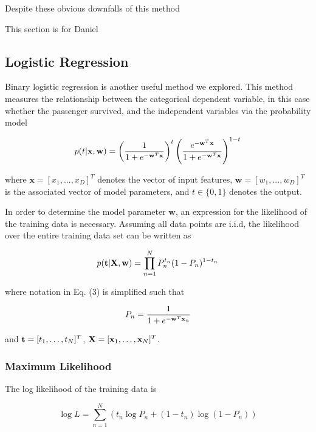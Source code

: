 \documentclass{article}
\begin{document}
Despite these obvious downfalls of this method 


This section is for Daniel



\subsection{Logistic Regression}

Binary logistic regression is another useful method we explored.
This method measures the relationship between the categorical dependent variable, in this case whether the passenger survived, and the independent variables via the probability model 

\begin{equation}
{ p(t|{\bf x},{\bf w}) =
   \left( \frac{1}{1+e^{-{\bf w}^T{\bf x}}} \right)^t
   \left( \frac{e^{-{\bf w}^T{\bf x}}}{1+e^{-{\bf w}^T{\bf x}}} \right)^{1-t} }
\end{equation}

where $\textbf{x} = [x_1,..., x_D]^T$ denotes the vector of input features, $\textbf{w} = [w_1,...,w_D]^T$ is the associated vector of model parameters, and $t\in\{0,1\}$ denotes the output.

In order to determine the model parameter $\textbf{w}$, an expression for the likelihood of the training data is necessary. Assuming all data points are i.i.d, the likelihood over the entire training data set can be written as 

\begin{equation}
p({\bf t}|{\bf X},{\bf w}) = \prod_{n=1}^NP_n^{t_n} (1-P_n)^{1-t_n} 
\end{equation}

where notation in Eq. (3) is simplified such that

\begin{equation}
{P_n = \frac{1}{1+e^{-{\bf w}^T{\bf x}_n}} }
\end{equation}

and ${\bf t}=[t_1,\ldots,t_N]^T$, ${\bf X} = [{\bf x}_1,\ldots,{\bf x}_N]^T$.

\subsubsection{Maximum Likelihood}
The log likelihood of the training data is 

\begin{equation}
{ \log L =\sum_{n=1}^N \left( t_n\log P_n+ ({1-t_n})\log(1-P_n) \right) }
\end{equation}
\end{document}
